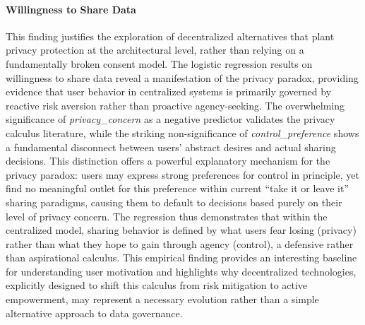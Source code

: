 	\paragraph{Willingness to Share Data}
	This finding justifies the exploration of decentralized alternatives that plant privacy protection at the architectural level, rather than relying on a fundamentally broken consent model. The logistic regression results on willingness to share data reveal a manifestation of the privacy paradox, providing evidence that user behavior in centralized systems is primarily governed by reactive risk aversion rather than proactive agency-seeking. The overwhelming significance of \textit{privacy\_concern} as a negative predictor validates the privacy calculus literature, while the striking non-significance of \textit{control\_preference} shows a fundamental disconnect between users' abstract desires and actual sharing decisions. This distinction offers a powerful explanatory mechanism for the privacy paradox: users may express strong preferences for control in principle, yet find no meaningful outlet for this preference within current ``take it or leave it'' sharing paradigms, causing them to default to decisions based purely on their level of privacy concern. The regression thus demonstrates that within the centralized model, sharing behavior is defined by what users fear losing (privacy) rather than what they hope to gain through agency (control), a defensive rather than aspirational calculus. This empirical finding provides an interesting baseline for understanding user motivation and highlights why decentralized technologies, explicitly designed to shift this calculus from risk mitigation to active empowerment, may represent a necessary evolution rather than a simple alternative approach to data governance.
	
